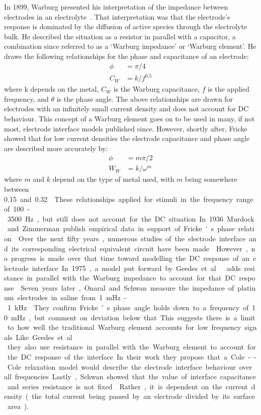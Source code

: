     In 1899, Warburg presented his interpretation of the impedance between electrodes in an electrolyte~\cite{Warburg1899}.
    That interpretation was that the electrode's response is dominated by the diffusion of active species through the electrolyte bulk.
    He described the situation as a resistor in parallel with a capacitor, a combination since referred to as a `Warburg impedance' or `Warburg element'.
    He draws the following relationships for the phase and capacitance of an electrode:
    \begin{align}
      \phi &= \pi / 4\\
      C_W &= k/f^{0.5}
    \end{align}
    where k depends on the metal, $C_W$ is the Warburg capacitance, $f$ is the applied frequency, and $\theta$ is the phase angle.
    The above relationships are drawn for electrodes with an infinitely small current density and does not account for DC behaviour.
    This concept of a Warburg element goes on to be used in many, if not most, electrode interface models published since.
    However, shortly after, Fricke showed that for low current densities the electrode capacitance and phase angle are described more accurately by:
    \begin{align}
      \phi &= m \pi / 2\\
      W_W &= k/\omega^m
    \end{align}
    where $m$ and $k$ depend on the type of metal used, with $m$ being somewhere between \SI{0.15} and \SI{0.32}~\cite{Fricke1932}.
    These relationships applied for stimuli in the frequency range of \SI{100}-\SI{3500}{\hertz}, but still does not account for the DC situation.
    In 1936 Murdock and Zimmerman publish empirical data in support of Fricke's phase relation~\cite{Murdock1936}.
    Over the next fifty years, numerous studies of the electrode interface and its corresponding electrical equivalent circuit have been made~\cite{Randles1947,Epelboin1973,Sluyters-Rehbach1970}.
    However, no progress is made over that time toward modelling the DC response of an electrode interface.
    In 1975, a model put forward by Geedes et. al\ adds resistance in parallel with the Warburg impedance to account for that DC response~\cite{Geddes1975}.
    Seven years later, Onaral and Schwan measure the impedance of platinum electrodes in saline from \SI{1}{\milli\hertz}-\SI{1}{\kilo\hertz}~\cite{Onaral1982}.
    They confirm Fricke's phase angle holds down to a frequency of \SI{10}{\milli\hertz}, but comment on deviation below that.
    This suggests there is a limit to how well the traditional Warburg element accounts for low frequency signals.
    Like Geedes et. al\, they also use resistance in parallel with the Warburg element to account for the DC response of the interface.
    In their work they propose that a Cole--Cole relaxation model would describe the electrode interface behaviour over all frequencies.
    Lastly, Schwan showed that the value of interface capacitance and series resistance is not fixed~\cite{Schwan1968}.
    Rather, it is dependent on the current density (the total current being passed by an electrode divided by its surface area).

